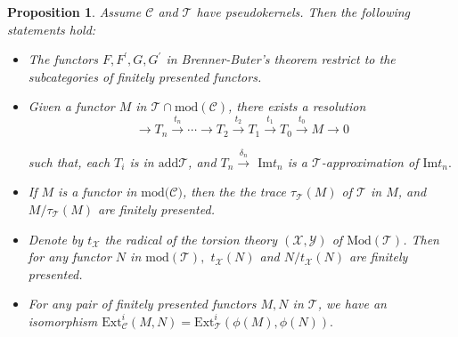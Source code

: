 \documentclass{amsart}
\theoremstyle{plain}
\newtheorem{proposition}{Proposition}
\numberwithin{equation}{section}
\begin{document}
\begin{proposition}
\label{BrennerB10} \bigskip Assume $\mathcal{C}$ and $\mathcal{T}$ have
pseudokernels. Then the following statements hold:

\begin{itemize}
\item[(i)] The functors $F,F^{\prime} ,G,G^{\prime} $ in Brenner-Buter's
theorem restrict to the subcategories of finitely presented functors.

\item[(ii)] Given a functor $M$ in $\mathscr T\cap \mathrm{mod}(\mathcal{C})$, there exists a resolution
\begin{equation*}
\rightarrow T_{n}\overset{t _{n}}{\rightarrow }\cdots\rightarrow T_{2}\overset{t_{2}}{\rightarrow }T_{1}\overset{t _{1}}{\rightarrow }T_{0}\overset{t_{0}}{\rightarrow }M\rightarrow 0
\end{equation*}

such that, each $T_{i}$ is in $\mathrm{add}\mathcal{T}$, and $T_{n}\overset{\delta _{n}}{\rightarrow }$ $\mathrm{Im}t _{n}$ is a $\mathcal{T}$-approximation of $\mathrm{Im}t _{n}.$

\item[(iii)] If $M$ is a functor in $\mathrm{mod}(\mathcal{C)}$, then the
the trace $\tau _{\mathcal{T}}(M)$ of $\mathcal{T}$ in $M$, and $M/\tau _{\mathcal{T}}(M)$ are finitely presented.

\item[(iv)] Denote by $t_{\mathscr{X}}$ the radical of the torsion theory $(\mathscr{X},\mathscr{Y})$ of $\mathrm{Mod}(\mathcal{T})$. Then for any
functor $N$ in $\mathrm{mod}(\mathcal{T}),$ $t_{\mathscr{X}}(N)$ and $N/t_{\mathscr{X}}(N)$ are finitely presented.

\item[(v)] For any pair of finitely presented functors $M,N$ in $\mathscr{T}$, we have an isomorphism $\mathrm{Ext}_{\mathcal{C}}^{i}(M,N)=\mathrm{Ext}_{\mathcal{T}}^{i}(\phi (M),\phi (N)).$
\end{itemize}
\end{proposition}
\end{document}
